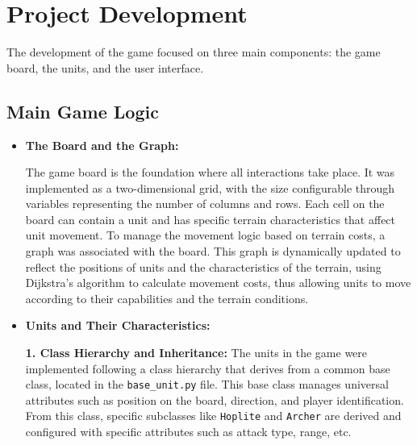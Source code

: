 \section{Project Development}
The development of the game focused on three main components: the game board, the units, and the user interface.

\subsection{Main Game Logic}

\begin{itemize}

    \item \textbf{The Board and the Graph:}
    
    The game board is the foundation where all interactions take place. It was implemented as a two-dimensional grid, with the size configurable through variables representing the number of columns and rows. Each cell on the board can contain a unit and has specific terrain characteristics that affect unit movement. To manage the movement logic based on terrain costs, a graph was associated with the board. This graph is dynamically updated to reflect the positions of units and the characteristics of the terrain, using Dijkstra's algorithm to calculate movement costs, thus allowing units to move according to their capabilities and the terrain conditions.

    \item \textbf{Units and Their Characteristics:}

    \textbf{1. Class Hierarchy and Inheritance:}
    The units in the game were implemented following a class hierarchy that derives from a common base class, located in the \texttt{base\_unit.py} file. This base class manages universal attributes such as position on the board, direction, and player identification. From this class, specific subclasses like \texttt{Hoplite} and \texttt{Archer} are derived and configured with specific attributes such as attack type, range, etc.
    

\end{itemize}
